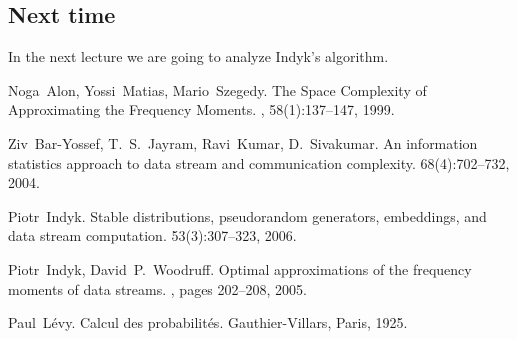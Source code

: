 \documentclass[11pt]{article}
\begin{document}
\subsection{Next time}

In the next lecture we are going to analyze Indyk's algorithm.






\begin{thebibliography}{42}

Noga~Alon, Yossi~Matias, Mario~Szegedy.
\newblock The Space Complexity of Approximating the Frequency Moments.
, 58(1):137--147, 1999.

Ziv~Bar-Yossef, T.~S.~Jayram, Ravi~Kumar, D.~Sivakumar.
\newblock An information statistics approach to data stream and communication complexity.
 68(4):702--732, 2004.

Piotr~Indyk.
\newblock Stable distributions, pseudorandom generators, embeddings, and data stream computation.
 53(3):307--323, 2006.

Piotr~Indyk, David~P.~Woodruff.
\newblock Optimal approximations of the frequency moments of data streams. 
, pages 202--208, 2005.

Paul~L\'{e}vy.
\newblock Calcul des probabilit\'{e}s.
\newblock Gauthier-Villars, Paris, 1925.

\end{thebibliography}
\end{document}
